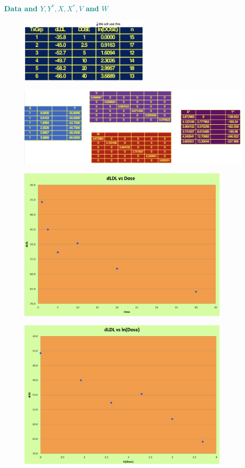 \documentclass[14pt]{extarticle}
\begin{document}
\textbf{\textcolor{teal}{Data and \( Y, Y^*, X, X^*, V \) and \( W \)}}
\begin{figure}[H]
    \centering
    \includegraphics[width=0.55\textwidth]{fig2.png}
\end{figure}     
\begin{figure}[H]
    \centering
    \includegraphics[width=1\textwidth]{fig3.png}
\end{figure}     
\begin{figure}[H]
    \centering
    \includegraphics[width=0.9\textwidth]{fig4.png}
\end{figure}   
\begin{figure}[H]
    \centering
    \includegraphics[width=0.9\textwidth]{fig5.png}
\end{figure}   
\end{document}
